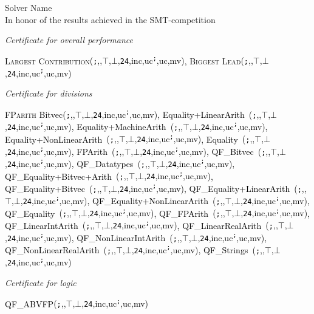 \documentclass[a4paper,landscape,12pt]{article}
\newcommand{\seq}{\texttt{;}}
\newcommand{\paral}{\textbardbl}
\newcommand{\sat}{$\top$}
\newcommand{\unsat}{$\bot$}
\newcommand{\fast}{\texttt{24}}
\newcommand{\inc}{inc}
\newcommand{\uc}{uc\textsuperscript}
\newcommand{\mv}{mv}
\begin{document}

{\centering
{

\begin{minipage}{\textwidth}
\centering

\end{minipage}

\begin{myframe}

\textcolor{red!10!black!90}
{\Huge Solver Name}\\

\textcolor{green!10!black!90}{
\large In honor of the results achieved in the SMT-competition}

\medskip

\textcolor{red!30!black!90}
{\textit{Certificate for overall performance}}

\newcommand{\all}{{\footnotesize (\seq,\paral,\sat,\unsat,\fast,\inc,\uc\seq,\uc\paral,\mv)}}

\textcolor{black}{\large
 \textsc{Largest Contribution}\all,
 \textsc{Biggest Lead}\all}

 \medskip
\textcolor{red!30!black!90} {\textit{Certificate for divisions}}

 \textcolor{black}{\large
 \textsc{FParith}
Bitvec\all,
 Equality+LinearArith~\all,
 Equality+MachineArith~\all,
 Equality+NonLinearArith~\all,
 Equality~\all,
 FPArith~\all,
 QF\_Bitvec~\all,
 QF\_Datatypes~\all,
 QF\_Equality+Bitvec+Arith~\all,
 QF\_Equality+Bitvec~\all,
 QF\_Equality+LinearArith~\all,
 QF\_Equality+NonLinearArith~\all,
 QF\_Equality~\all,
 QF\_FPArith~\all,
 QF\_LinearIntArith~\all,
 QF\_LinearRealArith~\all,
 QF\_NonLinearIntArith~\all,
 QF\_NonLinearRealArith~\all,
 QF\_Strings~\all
 }

 \medskip
 \textcolor{red!30!black!90}  {\textit{Certificate for logic}}

 \textcolor{black}{\large QF\_ABVFP\all
 }

\vspace{2mm}


\vspace{1cm}

{\color{blue!40!black}
}
\end{myframe}

}}
\end{document}
